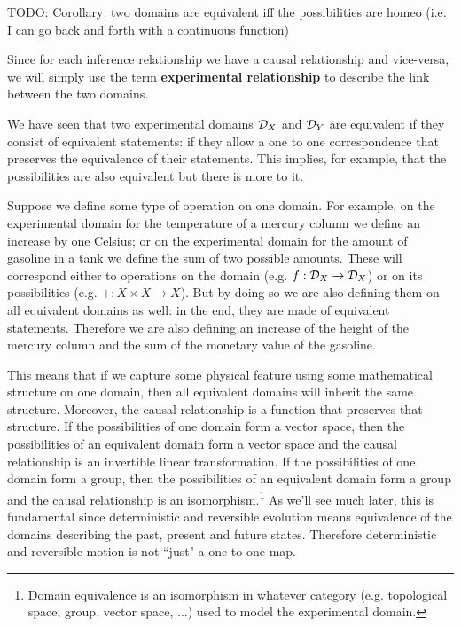 \documentclass[11pt,letterpaper,fleqn]{memoir} %
\begin{document}
\begin{mathSection}
TODO: Corollary: two domains are equivalent iff the possibilities are homeo (i.e. I can go back and forth with a continuous function)
\end{mathSection}

Since for each inference relationship we have a causal relationship and vice-versa, we will simply use the term \textbf{experimental relationship} to describe the link between the two domains.

We have seen that two experimental domains $\mathcal{D}_X$ and $\mathcal{D}_Y$ are equivalent if they consist of equivalent statements: if they allow a one to one correspondence that preserves the equivalence of their statements. This implies, for example, that the possibilities are also equivalent but there is more to it.

Suppose we define some type of operation on one domain. For example, on the experimental domain for the temperature of a mercury column we define an increase by one Celsius; or on the experimental domain for the amount of gasoline in a tank we define the sum of two possible amounts. These will correspond either to operations on the domain (e.g. $f : \mathcal{D}_X \to \mathcal{D}_X$) or on its possibilities (e.g. $+ : X \times X \to X$). But by doing so we are also defining them on all equivalent domains as well: in the end, they are made of equivalent statements. Therefore we are also defining an increase of the height of the mercury column and the sum of the monetary value of the gasoline.

This means that if we capture some physical feature using some mathematical structure on one domain, then all equivalent domains will inherit the same structure. Moreover, the causal relationship is a function that preserves that structure. If the possibilities of one domain form a vector space, then the possibilities of an equivalent domain form a vector space and the causal relationship is an invertible linear transformation. If the possibilities of one domain form a group, then the possibilities of an equivalent domain form a group and the causal relationship is an isomorphism.\footnote{Domain equivalence is an isomorphism in whatever category (e.g. topological space, group, vector space, ...) used to model the experimental domain.} As we'll see much later, this is fundamental since deterministic and reversible evolution means equivalence of the domains describing the past, present and future states. Therefore deterministic and reversible motion is not ``just" a one to one map.
\end{document}

